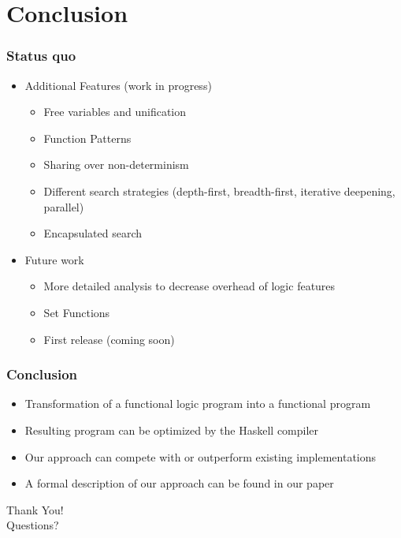 \documentclass[utf8]{beamer}
\begin{document}
\section{Conclusion}

\begin{frame}
\frametitle{Status quo}
\begin{itemize}
\item Additional Features (work in progress)
\begin{itemize}
\item Free variables and unification
\item Function Patterns
\item Sharing over non-determinism
\item Different search strategies (depth-first, breadth-first, iterative deepening, parallel)
\item Encapsulated search
\end{itemize}
\item Future work
\begin{itemize}
\item More detailed analysis to decrease overhead of logic features
\item Set Functions
\item First release (coming soon)
\end{itemize}
\end{itemize}
\end{frame}


\begin{frame}
\frametitle{Conclusion}
\begin{itemize}
\item Transformation of a functional logic program into a functional program
\item Resulting program can be optimized by the Haskell compiler
\item Our approach can compete with or outperform existing implementations
\item A formal description of our approach can be found in our paper
\end{itemize}
\end{frame}

\begin{frame}
\begin{center}
{\huge Thank You!}\\[3ex]
\pause
{\huge Questions?}
\end{center}
\end{frame}
\end{document}
